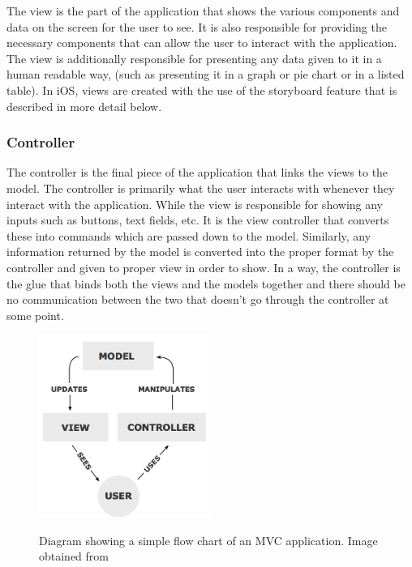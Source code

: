 \documentclass[main.tex]{subfiles}
\begin{document}
The view is the part of the application that shows the various components and data on the screen for the user to see. It is also responsible for providing the necessary components that can allow the user to interact with the application. The view is additionally responsible for presenting any data given to it in a human readable way, (such as presenting it in a graph or pie chart or in a listed table). In iOS, views are created with the use of the storyboard feature that is described in more detail below.

\subsubsection{Controller}

The controller is the final piece of the application that links the views to the model. The controller is primarily what the user interacts with whenever they interact with the application. While the view is responsible for showing any inputs such as buttons, text fields, etc. It is the view controller that converts these into commands which are passed down to the model. Similarly, any information returned by the model is converted into the proper format by the controller and given to proper view in order to show. In a way, the controller is the glue that binds both the views and the models together and there should be no communication between the two that doesn’t go through the controller at some point.

\begin{figure}[H]
\centering
\includegraphics[width=0.5\textwidth]{images-implementation/MVCLayout.png}
\label{MVC}
\caption{Diagram showing a simple flow chart of an MVC application. Image obtained from \cite{mvc}}
\end{figure}
\end{document}
